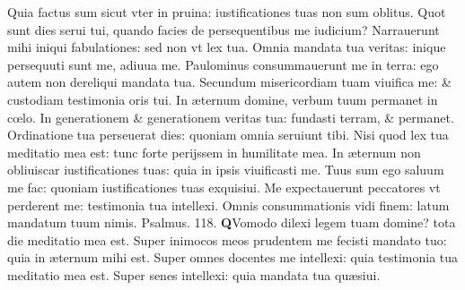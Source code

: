 \documentclass[a5paper,10pt]{book}
\def\ae{æ}
\def\oe{œ}
\begin{document}
\begin{multicols*}{2}
\newline \color{red} Q\color{black}uia factus sum sicut vter in pruina: iustificationes tuas non sum oblitus.
\newline \color{red} Q\color{black}uot sunt dies serui tui, quando facies de persequentibus me iudicium?
\newline \color{red} N\color{black}arrauerunt mihi iniqui fabulationes: sed non vt lex tua.
\newline \color{red} O\color{black}mnia mandata tua veritas: inique persequuti sunt me, adiuua me.
\newline \color{red} P\color{black}aulominus consummauerunt me in terra: ego autem non dereliqui mandata tua.
\newline \color{red} S\color{black}ecundum misericordiam tuam viuifica me: \& custodiam testimonia oris tui.
\newline \color{red} I\color{black}n \ae ternum domine, verbum tuum permanet in c\oe lo.
\newline \color{red} I\color{black}n generationem \& generationem veritas tua: fundasti terram, \& permanet.
\newline \color{red} O\color{black}rdinatione tua perseuerat dies: quoniam omnia seruiunt tibi.
\newline \color{red} N\color{black}isi quod lex tua meditatio mea est: tunc forte perijssem in humilitate mea.
\newline \color{red} I\color{black}n \ae ternum non obliuiscar iustificationes tuas: quia in ipsis viuificasti me.
\newline \color{red} T\color{black}uus sum ego saluum me fac: quoniam iustificationes tuas exquisiui.
\newline \color{red} M\color{black}e expectauerunt peccatores vt perderent me: testimonia tua intellexi.
\newline \color{red} O\color{black}mnis consummationis vidi finem: latum mandatum tuum nimis. \quad \color{red} Psalmus. \hypertarget{ps118.7}{118.} \color{black}
\vspace{-.5em}
\lettrine[lines=2]{\bfseries \color{red} Q}{}Vomodo dilexi legem tuam domine? tota die meditatio mea est.
\newline \color{red} S\color{black}uper inimocos meos prudentem me fecisti mandato tuo: quia in \ae ternum mihi est.
\newline \color{red} S\color{black}uper omnes docentes me intellexi: quia testimonia tua meditatio mea est.
\newline \color{red} S\color{black}uper senes intellexi: quia mandata tua qu\ae siui.

\end{multicols*}
\end{document}
